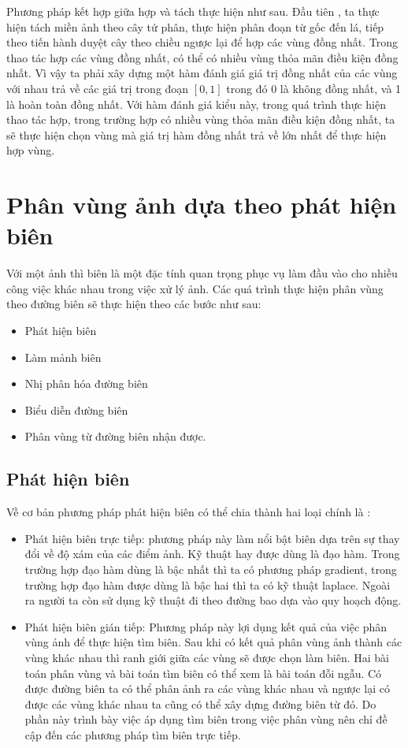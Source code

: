 \documentclass[12pt, oneside, a4]{book}
\begin{document}
Phương pháp kết hợp giữa hợp và tách thực hiện như sau. Đầu tiên , ta thực hiện tách miền ảnh theo cây tứ phân, thực hiện phân đoạn từ gốc đến lá, tiếp theo tiến hành duyệt cây theo chiều ngược lại để hợp các vùng đồng nhất. Trong thao tác hợp các vùng đồng nhất, có thể có nhiều vùng thỏa mãn điều kiện đồng nhất. Vì vậy ta phải xây dựng một hàm đánh giá giá trị đồng nhất của các vùng với nhau trả về các giá trị trong đoạn $[0,1]$ trong  đó 0 là không đồng nhất, và 1 là hoàn toàn đồng nhất. Với hàm đánh giá kiểu này,  trong quá trình thực hiện thao tác hợp, trong trường hợp có nhiều vùng thỏa mãn điều kiện đồng nhất, ta sẽ thực hiện chọn vùng mà giá trị hàm đồng nhất trả về lớn nhất để thực hiện hợp vùng.
\section{Phân vùng ảnh dựa theo phát hiện biên}
Với một ảnh thì biên là một đặc tính quan trọng phục vụ làm đầu vào cho nhiều công việc khác nhau trong việc xử lý ảnh. 
Các quá trình thực hiện phân vùng theo đường biên sẽ thực hiện theo các bước như sau:
\begin{itemize}
\item Phát hiện biên
\item Làm mảnh biên
\item Nhị phân hóa đường biên
\item Biểu diễn đường biên
\item Phân vùng từ đường biên nhận được.
\end{itemize}
\subsection{Phát hiện biên }
Về cơ bản phương pháp phát hiện biên có thể chia thành hai loại chính là :
\begin{itemize}
\item Phát hiện biên trực tiếp: phương pháp này làm nổi bật biên dựa trên sự thay đổi về độ xám của các điểm ảnh. Kỹ thuật hay được dùng là đạo hàm. Trong trường hợp đạo hàm dùng là bậc nhất thì ta có phương pháp gradient, trong trường hợp đạo hàm được dùng là bậc hai thì ta có kỹ thuật laplace. Ngoài ra người ta còn sử dụng kỹ thuật đi theo đường bao dựa vào quy hoạch động.
\item Phát hiện biên gián tiếp:  Phương pháp này lợi dụng kết quả của việc phân vùng ảnh để thực hiện tìm biên. Sau khi có kết quả phân vùng ảnh thành các vùng khác nhau thì ranh giới giữa các vùng sẽ được chọn làm biên. Hai bài toán phân vùng  và bài toán tìm biên có thể xem là bài toán đỗi ngẫu. Có được đường biên ta có thể phân ảnh ra các vùng khác nhau và ngược lại có được các vùng khác nhau ta cũng có thể xây dựng đường biên từ đó. Do phần này trình bày việc áp dụng tìm biên trong việc phân vùng nên chỉ đề cập đến các phương pháp tìm biên trực tiếp.
\end{itemize}
\end{document}
